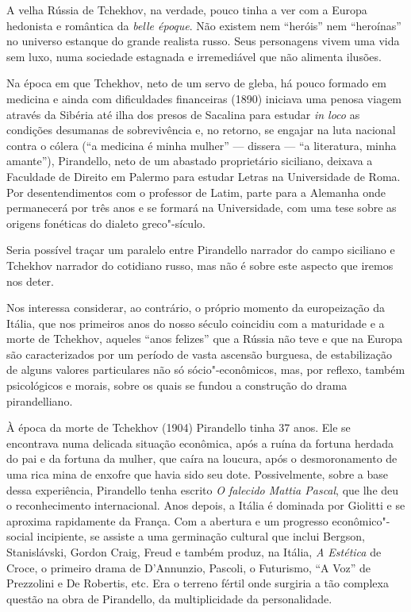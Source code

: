 A velha Rússia de Tchekhov, na verdade, pouco tinha a ver com a Europa
hedonista e romântica da \emph{belle époque}. Não existem nem ``heróis''
nem ``heroínas'' no universo estanque do grande realista russo. Seus
personagens vivem uma vida sem luxo, numa sociedade estagnada e
irremediável que não alimenta ilusões.

Na época em que Tchekhov, neto de um servo de gleba, há pouco formado em
medicina e ainda com dificuldades financeiras (1890) iniciava uma penosa
viagem através da Sibéria até ilha dos presos de Sacalina para estudar
\emph{in loco} as condições desumanas de sobrevivência e, no retorno, se
engajar na luta nacional contra o cólera (``a medicina é minha mulher'' ---
dissera --- ``a literatura, minha amante''), Pirandello, neto de um abastado
proprietário siciliano, deixava a Faculdade de Direito em Palermo para
estudar Letras na Universidade de Roma. Por desentendimentos com o
professor de Latim, parte para a Alemanha onde permanecerá por três anos
e se formará na Universidade, com uma tese sobre as origens fonéticas do
dialeto greco"-sículo.

Seria possível traçar um paralelo entre Pirandello narrador do campo
siciliano e Tchekhov narrador do cotidiano russo, mas não é sobre
este aspecto que iremos nos deter.

Nos interessa considerar, ao contrário, o próprio momento da
europeização da Itália, que nos primeiros anos do nosso século coincidiu
com a maturidade e a morte de Tchekhov, aqueles ``anos felizes'' que a
Rússia não teve e que na Europa são caracterizados por um período de
vasta ascensão burguesa, de estabilização de alguns valores particulares
não só sócio"-econômicos, mas, por reflexo, também psicológicos e morais,
sobre os quais se fundou a construção do drama pirandelliano.

À época da morte de Tchekhov (1904) Pirandello tinha 37 anos. Ele se
encontrava numa delicada situação econômica, após a ruína da fortuna
herdada do pai e da fortuna da mulher, que caíra na loucura, após o
desmoronamento de uma rica mina de enxofre que havia sido seu dote.
Possivelmente, sobre a base dessa experiência, Pirandello tenha escrito
\emph{O falecido Mattia Pascal}, que lhe deu o reconhecimento
internacional. Anos depois, a Itália é dominada por Giolitti e se
aproxima rapidamente da França. Com a abertura e um progresso
econômico"-social incipiente, se assiste a uma germinação cultural que
inclui Bergson, Stanislávski, Gordon Craig, Freud e também produz, na
Itália, \emph{A Estética} de Croce, o primeiro drama de D'Annunzio,
Pascoli, o Futurismo, ``A Voz'' de Prezzolini e De Robertis, etc. Era o
terreno fértil onde surgiria a tão complexa questão na obra de
Pirandello, da multiplicidade da personalidade.

